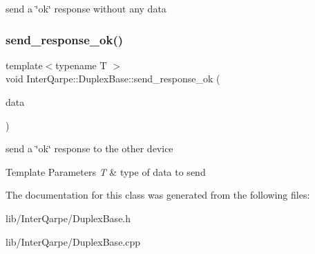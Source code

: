 send a \char`\"{}ok\char`\"{} response without any data \mbox{\label{classInterQarpe_1_1DuplexBase_aa7f5efac1989b9a1f9f45eb5f6127d80}} 
\subsubsection{\texorpdfstring{send\+\_\+response\+\_\+ok()}{send\_response\_ok()}\hspace{0.1cm}{\footnotesize\ttfamily [2/2]}}
{\footnotesize\ttfamily template$<$typename T $>$ \\
void Inter\+Qarpe\+::\+Duplex\+Base\+::send\+\_\+response\+\_\+ok (\begin{DoxyParamCaption}\item[{T}]{data }\end{DoxyParamCaption})\hspace{0.3cm}{\ttfamily [protected]}}

send a \char`\"{}ok\char`\"{} response to the other device


\begin{DoxyTemplParams}{Template Parameters}
{\em T} & type of data to send \\
\hline
\end{DoxyTemplParams}


The documentation for this class was generated from the following files\+:\begin{DoxyCompactItemize}
\item 
lib/\+Inter\+Qarpe/Duplex\+Base.\+h\item 
lib/\+Inter\+Qarpe/Duplex\+Base.\+cpp\end{DoxyCompactItemize}
